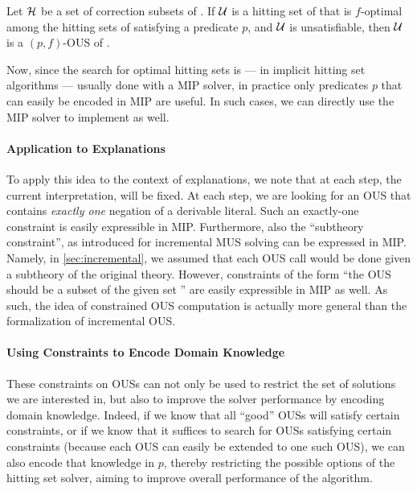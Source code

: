 \begin{proposition}\label{prop:K2}
  Let $\mathcal{H}$ be a set of correction subsets of \mcses{\formula}. 
  If $\mathcal{U}$ is a hitting set of  that is $f$-optimal among the hitting sets of  satisfying a predicate $p$, and  $\mathcal{U}$ is unsatisfiable, then $\mathcal{U}$ is a $(p,f)$-OUS of \formula. 
\end{proposition}

Now, since the search for optimal hitting sets is --- in implicit hitting set algorithms --- usually done with a MIP solver, in practice only predicates $p$ that can easily be encoded in MIP are useful. In such cases, we can directly use the MIP solver to implement \cohs as well. 

\paragraph{Application to Explanations}
To apply this idea to the context of explanations, we note that at each step, the current interpretation, will be fixed. 
At each step, we are looking for an OUS that contains \emph{exactly one} negation of a derivable literal. 
Such an exactly-one constraint is easily expressible in MIP.
Furthermore, also the ``subtheory constraint'', as introduced for incremental MUS solving can be expressed in MIP. Namely, in \cref{sec:incremental}, we assumed that each OUS call would be done given a subtheory of the original theory. However, constraints of the form ``the OUS should be a subset of the given set \formula'' are easily expressible in MIP as well. 
As such, the idea of constrained OUS computation is actually more general than the formalization of incremental OUS. 


\paragraph{Using Constraints to Encode Domain Knowledge}
These constraints on OUSs can not only be used to restrict the set of solutions we are interested in, but also to improve the solver performance by encoding domain knowledge.
Indeed, if we know that all ``good'' OUSs will satisfy certain constraints, or if we know that it suffices to search for OUSs satisfying certain constraints (because each OUS can easily be extended to one such OUS),  we can also encode that knowledge in $p$, thereby restricting the possible options of the hitting set solver, aiming to improve overall performance of the algorithm. 


